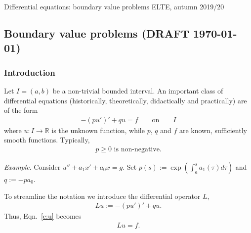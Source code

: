 \documentclass[12pt,a4paper]{article}
\newcommand{\from}{\colon}
\newcommand{\IR}{\mathbb{R}}
\begin{document}
    
    Differential equations: boundary value problems
    \hfill
    ELTE, autumn 2019/20
    
    \subsection*{Boundary value problems (DRAFT \today)}
    
    \subsubsection*{Introduction}
    
    
    Let $I = (a, b)$ be a non-trivial bounded interval.
    An important class of differential equations
    (historically, theoretically, didactically and practically)
    are
    of the form
    \begin{align}
        \label{e:u}
        -(p u')' + q u = f
        \qquad\text{on}\qquad
        I
    \end{align}
    where 
    $u \from I \to \IR$
    is the unknown function,
    while $p$, $q$ and $f$ are known, sufficiently smooth functions.
    Typically, 
    \begin{align}
        \label{e:p0}
        \text{$p \geq 0$ is non-negative.}
    \end{align}

    
    \emph{Example}.
    Consider $u'' + a_1 x' + a_0 x = g$.
    Set $p(s) := \exp(\int_a^s a_1(\tau) d\tau)$
    and $q := -p a_0$.
    
    
    
    To streamline the notation we introduce 
    the differential operator $L$,
    \begin{align}
        \label{e:L}
        L u :=
        -(p u')' + q u
        .
    \end{align}
    Thus, Eqn.~\eqref{e:u} becomes
    \begin{align}
        \label{e:Lu}
        L u = f
        .
    \end{align}

    
    
\end{document}
